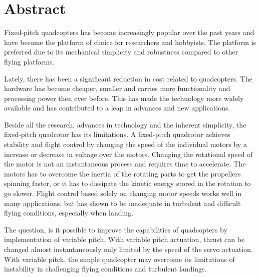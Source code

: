 
\chapter*{Abstract}
Fixed-pitch quadcopters has become increasingly popular over the past years and have become the platform of choice for researchers and hobbyists. The platform is preferred due to its mechanical simplicity and robustness compared to other flying platforms. \bigskip

Lately, there has been a significant reduction in cost related to quadcopters. The hardware has become cheaper, smaller and carries more functionality and processing power then ever before. This has made the technology more widely available and has contributed to a leap in advances and new applications. \bigskip

Beside all the research, advances in technology and the inherent simplicity, the fixed-pitch quadrotor has its limitations. A fixed-pitch quadrotor achieves stability and flight control by changing the speed of the individual motors by a increase or decrease in voltage over the motors. Changing the rotational speed of the motor is not an instantaneous process and requires time to accelerate. The motors has to overcome the inertia of the rotating parts to get the propellers spinning faster, or it has to dissipate the kinetic energy stored in the rotation to go slower. Flight control based solely on changing motor speeds works well in many applications, but has shown to be inadequate in turbulent and difficult flying conditions, especially when landing. \bigskip

The question, is it possible to improve the capabilities of quadcopters by implementation of variable pitch. With variable pitch actuation, thrust can be changed almost instantaneously only limited by the speed of the servo actuation. With variable pitch, the simple quadcopter may overcome its limitations of instability in challenging flying conditions and turbulent landings.

